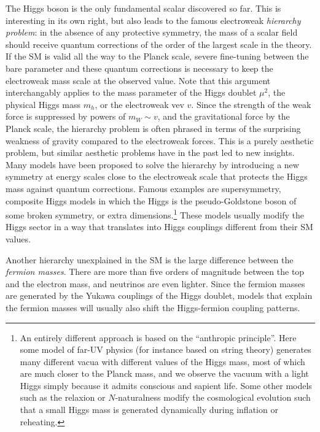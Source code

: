 The Higgs boson is the only fundamental scalar discovered so far. This
is interesting in its own right, but also leads to the famous
electroweak \emph{hierarchy problem}: in the absence of any protective
symmetry, the mass of a scalar field should receive quantum
corrections of the order of the largest scale in the theory. If the SM
is valid all the way to the Planck scale, severe fine-tuning between
the bare parameter and these quantum corrections is necessary to keep
the electroweak mass scale at the observed value. Note that this
argument interchangably applies to the mass parameter of the Higgs
doublet $\mu^2$, the physical Higgs mass $m_h$, or the electroweak vev
$v$. Since the strength of the weak force is suppressed by powers of
$m_W \sim v$, and the gravitational force by the Planck scale, the
hierarchy problem is often phrased in terms of the surprising weakness
of gravity compared to the electroweak forces. This is a purely
aesthetic problem, but similar aesthetic problems have in the past led
to new insights. Many models have been proposed to solve the hierarchy
by introducing a new symmetry at energy scales close to the
electroweak scale that protects the Higgs mass against quantum
corrections. Famous examples are supersymmetry, composite Higgs models
in which the Higgs is the pseudo-Goldstone boson of some broken
symmetry, or extra dimensions.\footnote{An entirely different approach
  is based on the ``anthropic principle''. Here some model of far-UV
  physics (for instance based on string theory) generates many
  different vacua with different values of the Higgs mass, most of
  which are much closer to the Planck mass, and we observe the vacuum
  with a light Higgs simply because it admits conscious and sapient
  life. Some other models such as the relaxion or $N$-naturalness
  modify the cosmological evolution such that a small Higgs mass is
  generated dynamically during inflation or reheating.} These models
usually modify the Higgs sector in a way that translates into Higgs
couplings different from their SM values.

Another hierarchy unexplained in the SM is the large difference
between the \emph{fermion masses}. There are more than five orders of
magnitude between the top and the electron mass, and neutrinos are
even lighter. Since the fermion masses are generated by the Yukawa
couplings of the Higgs doublet, models that explain the fermion masses
will usually also shift the Higgs-fermion coupling patterns.

